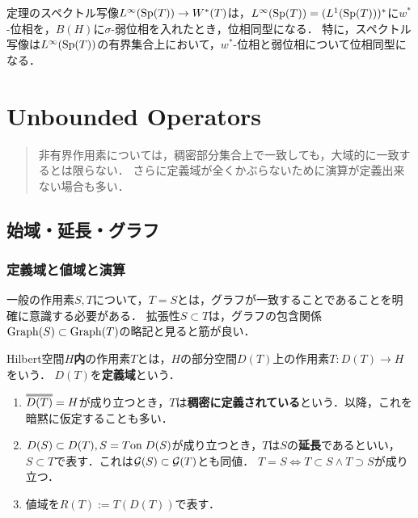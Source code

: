 \documentclass[uplatex,dvipdfmx]{jsreport}
\begin{document}
\begin{proposition}
    定理のスペクトル写像$L^\infty(\mathrm{Sp}(T))\to W^*(T)$は，$L^\infty(\mathrm{Sp}(T))=(L^1(\mathrm{Sp}(T)))^*$に$w^*$-位相を，$B(H)$に$\sigma$-弱位相を入れたとき，位相同型になる．
    特に，スペクトル写像は$L^\infty(\mathrm{Sp}(T))$の有界集合上において，$w^*$-位相と弱位相について位相同型になる．
\end{proposition}

\chapter{Unbounded Operators}

\begin{quotation}
    非有界作用素については，稠密部分集合上で一致しても，大域的に一致するとは限らない．
    さらに定義域が全くかぶらないために演算が定義出来ない場合も多い．
\end{quotation}

\section{始域・延長・グラフ}  

\subsection{定義域と値域と演算}

\begin{tcolorbox}[colframe=ForestGreen, colback=ForestGreen!10!white,breakable,colbacktitle=ForestGreen!40!white,coltitle=black,fonttitle=\bfseries\sffamily,
title=]
    一般の作用素$S,T$について，$T=S$とは，グラフが一致することであることを明確に意識する必要がある．
    拡張性$S\subset T$は，グラフの包含関係$\mathrm{Graph}(S)\subset\mathrm{Graph}(T)$の略記と見ると筋が良い．
\end{tcolorbox}

\begin{definition}
    Hilbert空間$H$\textbf{内}の作用素$T$とは，$H$の部分空間$D(T)$上の作用素$T:D(T)\to H$をいう．
    $D(T)$を\textbf{定義域}という．
    \begin{enumerate}
        \item $\oo{D(T)}=H$が成り立つとき，$T$は\textbf{稠密に定義されている}という．以降，これを暗黙に仮定することも多い．
        \item $D(S)\subset D(T),S=T\mathrm{on}\; D(S)$が成り立つとき，$T$は$S$の\textbf{延長}であるといい，$S\subset T$で表す．これは$\mathcal{G}(S)\subset\mathcal{G}(T)$とも同値．
        $T=S\Leftrightarrow T\subset S\land T\supset S$が成り立つ．
        \item 値域を$R(T):=T(D(T))$で表す．
    \end{enumerate}
\end{definition}
\end{document}
